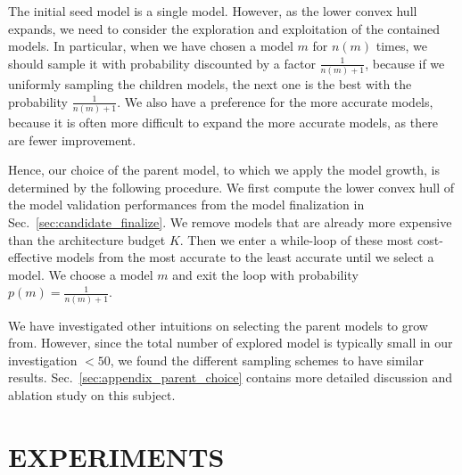 The initial seed model is a single model. 
However, as the lower convex hull expands, we need to consider the 
exploration and exploitation of the contained models. 
In particular, when we have chosen a model $m$ for $n(m)$ times, 
we should sample it with probability discounted by a factor $\frac{1}{n(m) + 1}$, 
because if we uniformly sampling the children models, 
the next one is the best with the probability $\frac{1}{n(m) + 1}$. 
We also have a preference for the more accurate models, because
it is often more difficult to expand the more accurate models, as there
are fewer improvement. 

Hence, our choice of the parent model, to which we apply the model growth,
is determined by the following procedure. 
We first compute the lower convex hull of the model validation performances 
from the model finalization in Sec.~\ref{sec:candidate_finalize}. 
We remove models that are already more expensive than the architecture budget
$K$. Then we enter a while-loop of these most cost-effective models 
from the most accurate to the least accurate until we select a model. 
We choose a model $m$ and exit the loop with probability $p(m) = \frac{1}{n(m) + 1}$.

We have investigated other intuitions on selecting the parent models to grow from. 
However, since the total number of explored model is typically small in our investigation $<50$,
we found the different sampling schemes to have similar results. Sec.~\ref{sec:appendix_parent_choice}
contains more detailed discussion and ablation study on this subject.

    
\section{EXPERIMENTS}
\label{sec:nas_experiment}






